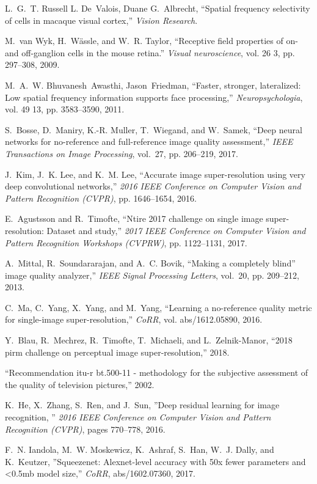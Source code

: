 \documentclass[10pt,twocolumn,letterpaper]{article}
\begin{document}
{\begin{thebibliography}{10}
L.~G.~T. Russell L. De~Valois, Duane G.~Albrecht, ``Spatial frequency
  selectivity of cells in macaque visual cortex,'' \emph{Vision Research}.

M.~van Wyk, H.~W{\"a}ssle, and W.~R. Taylor, ``Receptive field properties of
  on- and off-ganglion cells in the mouse retina.'' \emph{Visual neuroscience},
  vol. 26 3, pp. 297--308, 2009.

M.~A.~W. Bhuvanesh~Awasthi, Jason~Friedman, ``Faster, stronger, lateralized:
  Low spatial frequency information supports face processing,''
  \emph{Neuropsychologia}, vol. 49 13, pp. 3583--3590, 2011.

S.~Bosse, D.~Maniry, K.-R. Muller, T.~Wiegand, and W.~Samek, ``Deep neural
  networks for no-reference and full-reference image quality assessment,''
  \emph{IEEE Transactions on Image Processing}, vol.~27, pp. 206--219, 2017.

J.~Kim, J.~K. Lee, and K.~M. Lee, ``Accurate image super-resolution using very
  deep convolutional networks,'' \emph{2016 IEEE Conference on Computer Vision
  and Pattern Recognition (CVPR)}, pp. 1646--1654, 2016.

E.~Agustsson and R.~Timofte, ``Ntire 2017 challenge on single image
  super-resolution: Dataset and study,'' \emph{2017 IEEE Conference on Computer
  Vision and Pattern Recognition Workshops (CVPRW)}, pp. 1122--1131, 2017.

A.~Mittal, R.~Soundararajan, and A.~C. Bovik, ``Making a completely blind”
  image quality analyzer,'' \emph{IEEE Signal Processing Letters}, vol.~20, pp.
  209--212, 2013.

C.~Ma, C.~Yang, X.~Yang, and M.~Yang, ``Learning a no-reference quality metric
  for single-image super-resolution,'' \emph{CoRR}, vol. abs/1612.05890, 2016.

Y.~Blau, R.~Mechrez, R.~Timofte, T.~Michaeli, and L.~Zelnik-Manor, ``2018 pirm
  challenge on perceptual image super-resolution,'' 2018.

``Recommendation itu-r bt.500-11 - methodology for the subjective assessment of
  the quality of television pictures,'' 2002.

K.~He, X.~Zhang, S.~Ren, and J.~Sun, ''Deep residual learning for image recognition, '' \emph{2016 IEEE     Conference on Computer Vision and Pattern Recognition
  (CVPR)}, pages 770--778, 2016.

F.~N. Iandola, M.~W. Moskewicz, K.~Ashraf, S.~Han, W.~J. Dally, and K.~Keutzer, ''Squeezenet:          Alexnet-level accuracy with 50x fewer parameters and
 <0.5mb model size,'' \emph{CoRR}, abs/1602.07360, 2017.


\end{thebibliography}}
\end{document}
